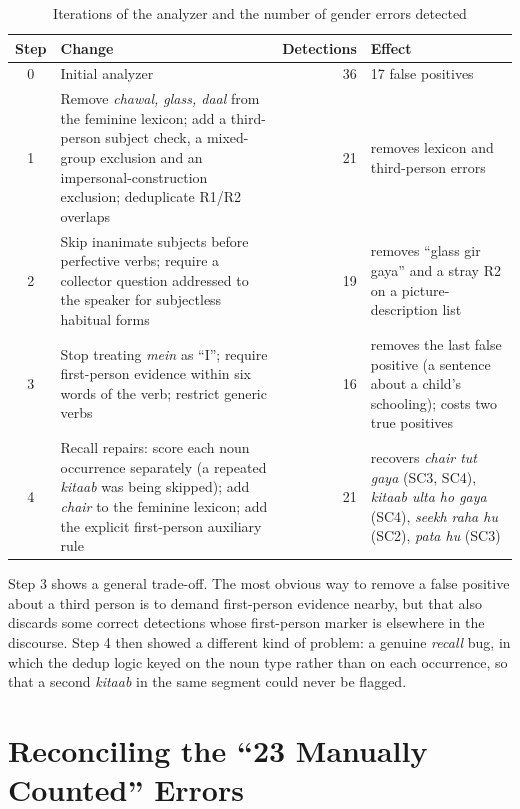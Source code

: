 \documentclass[11pt,a4paper]{report}
\begin{document}
\begin{table}[H]
\centering
\caption{Iterations of the analyzer and the number of gender errors detected}
\label{tab:iter}
\begin{tabularx}{\textwidth}{cp{6.2cm}rX}
\toprule
\textbf{Step} & \textbf{Change} & \textbf{Detections} & \textbf{Effect} \\
\midrule
0 & Initial analyzer & 36 & 17 false positives \\
1 & Remove \textit{chawal, glass, daal} from the feminine lexicon; add a third-person subject check, a mixed-group exclusion and an impersonal-construction exclusion; deduplicate R1/R2 overlaps & 21 & removes lexicon and third-person errors \\
2 & Skip inanimate subjects before perfective verbs; require a collector question addressed to the speaker for subjectless habitual forms & 19 & removes ``glass gir gaya'' and a stray R2 on a picture-description list \\
3 & Stop treating \textit{mein} as ``I''; require first-person evidence within six words of the verb; restrict generic verbs & 16 & removes the last false positive (a sentence about a child's schooling); costs two true positives \\
4 & Recall repairs: score each noun occurrence separately (a repeated \textit{kitaab} was being skipped); add \textit{chair} to the feminine lexicon; add the explicit first-person auxiliary rule & 21 & recovers \textit{chair tut gaya} (SC3, SC4), \textit{kitaab ulta ho gaya} (SC4), \textit{seekh raha hu} (SC2), \textit{pata hu} (SC3) \\
\bottomrule
\end{tabularx}
\end{table}

Step 3 shows a general trade-off. The most obvious way to remove a false positive about a third person is to demand first-person evidence nearby, but that also discards some correct detections whose first-person marker is elsewhere in the discourse. Step 4 then showed a different kind of problem: a genuine \emph{recall} bug, in which the dedup logic keyed on the noun type rather than on each occurrence, so that a second \textit{kitaab} in the same segment could never be flagged.

\section{Reconciling the ``23 Manually Counted'' Errors}
\end{document}
